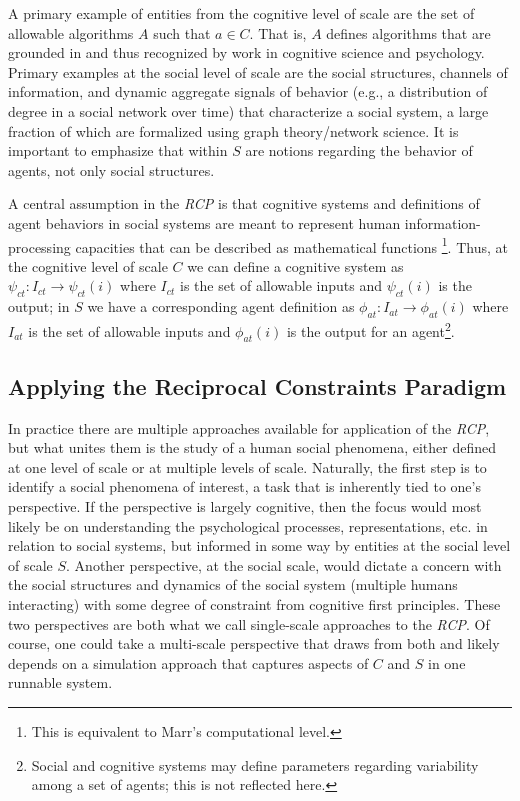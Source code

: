 \documentclass{article}
\begin{document}
A primary example of entities from the cognitive level of scale are the set of allowable algorithms $A$ such that $a \in C$. That is, $A$ defines algorithms that are grounded in and thus recognized by work in cognitive science and psychology.  Primary examples at the social level of scale are the social structures, channels of information, and dynamic aggregate signals of behavior (e.g., a distribution of degree in a social network over time) that characterize a social system, a large fraction of which are formalized using graph theory/network science.    It is important to emphasize that within $S$ are notions regarding the behavior of agents, not only social structures.

A central assumption in the \textit{RCP} is that cognitive systems and definitions of agent behaviors in social systems are meant to represent human information-processing capacities that can be described as mathematical functions\cite{van2008tractable} \footnote{This is equivalent to Marr's computational level\cite{Marr1982}.}. Thus, at the cognitive level of scale $C$ we can define a cognitive system as $\psi_{ct}: I_{ct} \rightarrow \psi_{ct}(i)$ where $I_{ct}$ is the set of allowable inputs and $\psi_{ct}(i)$ is the output; in $S$ we have a corresponding agent definition as $\phi_{at}: I_{at} \rightarrow \phi_{at}(i)$ where $I_{at}$ is the set of allowable inputs and $\phi_{at}(i)$ is the output for an agent\footnote{Social and cognitive systems may define parameters regarding variability among a set of agents; this is not reflected here.}. 

\subsection{Applying the Reciprocal Constraints Paradigm}   
In practice there are multiple approaches available for application of the \textit{RCP}, but what unites them is the study of a human social phenomena, either defined at one level of scale or at multiple levels of scale.  Naturally, the first step is to identify a social phenomena of interest, a task that is inherently tied to one's perspective.  If the perspective is largely cognitive, then the focus would most likely be on understanding the psychological processes, representations, etc. in relation to social systems, but informed in some way by entities at the social level of scale $S$.   Another perspective, at the social scale, would dictate a concern with the social structures and dynamics of the social system (multiple humans interacting) with some degree of constraint from cognitive first principles.  These two perspectives are both what we call single-scale approaches to the \textit{RCP}. Of course, one could take a multi-scale perspective that draws from both and likely depends on a simulation approach that captures aspects of $C$ and $S$ in one runnable system.  
\end{document}
